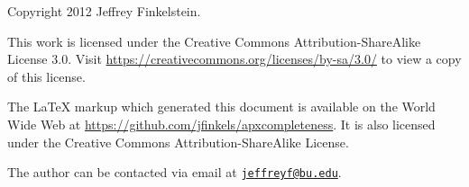 \documentclass[]{article}
\theoremstyle{plain}
\theoremstyle{definition}
\newcommand{\email}[1]{\href{mailto:#1}{\nolinkurl{#1}}}
\begin{document}
Copyright 2012 Jef{}frey Finkelstein.

This work is licensed under the Creative Commons Attribution-ShareAlike License 3.0.
Visit \mbox{\url{https://creativecommons.org/licenses/by-sa/3.0/}} to view a copy of this license.

The \LaTeX{} markup which generated this document is available on the World Wide Web at \mbox{\url{https://github.com/jfinkels/apxcompleteness}}.
It is also licensed under the Creative Commons Attribution-ShareAlike License.

The author can be contacted via email at \email{jeffreyf@bu.edu}.



\end{document}
